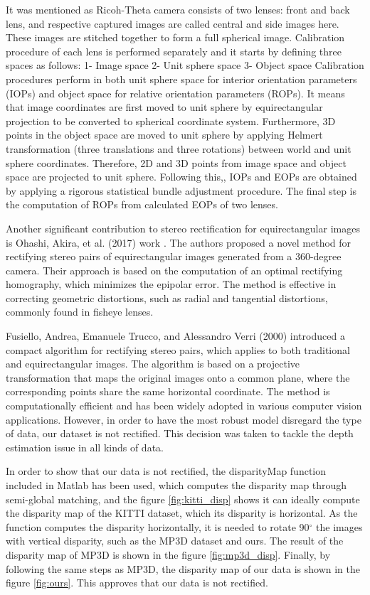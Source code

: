 \documentclass[english, LaM, oneside]{sapthesis}%
\begin{document}
It was mentioned as Ricoh-Theta camera consists of two lenses: front and back lens, and respective captured images are called central and side images here. These images are stitched together to form a full spherical image. Calibration procedure of each lens is performed separately and it starts by defining three spaces as follows: 1- Image space 2- Unit sphere space 3- Object space Calibration procedures perform in both unit sphere space for interior orientation parameters (IOPs) and object space for relative orientation parameters (ROPs). It means that image coordinates are first moved to unit sphere by equirectangular projection to be converted to spherical coordinate system. Furthermore, 3D points in the object space are moved to unit sphere by applying Helmert transformation (three translations and three rotations) between world and unit sphere coordinates. Therefore, 2D and 3D points from image space and object space are projected to unit sphere. Following this,, IOPs and EOPs are obtained by applying a rigorous statistical bundle adjustment procedure. The final step is the computation of ROPs from calculated EOPs of two lenses. 

Another significant contribution to stereo rectification for equirectangular images is Ohashi, Akira, et al. (2017) work \cite{ref:rectification2}. The authors proposed a novel method for rectifying stereo pairs of equirectangular images generated from a 360-degree camera. Their approach is based on the computation of an optimal rectifying homography, which minimizes the epipolar error. The method is effective in correcting geometric distortions, such as radial and tangential distortions, commonly found in fisheye lenses.

Fusiello, Andrea, Emanuele Trucco, and Alessandro Verri (2000) introduced a compact algorithm for rectifying stereo pairs, which applies to both traditional and equirectangular images\cite{ref:rectification3}. The algorithm is based on a projective transformation that maps the original images onto a common plane, where the corresponding points share the same horizontal coordinate. The method is computationally efficient and has been widely adopted in various computer vision applications.
However, in order to have the most robust model disregard the type of data, our dataset is not rectified. This decision was taken to tackle the depth estimation issue in all kinds of data. 


\vspace{1cm}
In order to show that our data is not rectified, the disparityMap function included in Matlab has been used, which computes the disparity map through semi-global matching, and the figure \ref{fig:kitti_disp} shows it can ideally compute the disparity map of the KITTI dataset, which its disparity is horizontal. As the function computes the disparity horizontally, it is needed to rotate 90$^{\circ}$ the images with vertical disparity, such as the MP3D dataset and ours. The result of the disparity map of MP3D is shown in the figure \ref{fig:mp3d_disp}. Finally, by following the same steps as MP3D, the disparity map of our data is shown in the figure \ref{fig:ours}. This approves that our data is not rectified. 
\end{document}
